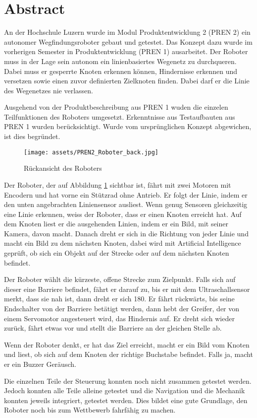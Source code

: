 \section*{Abstract}


An der Hochschule Luzern wurde im Modul Produktentwicklung 2 (PREN 2) ein autonomer Wegfindungsroboter gebaut und getestet. Das Konzept dazu wurde im vorherigen Semester in Produktentwicklung (PREN 1) ausarbeitet. Der Roboter muss in der Lage sein autonom ein linienbasiertes Wegenetz zu durchqueren. Dabei muss er gesperrte Knoten erkennen können, Hindernisse erkennen und versetzen sowie einen zuvor definierten Zielknoten finden. Dabei darf er die Linie des Wegenetzes nie verlassen.


Ausgehend von der Produktbeschreibung aus PREN 1 wuden die einzelen Teilfunktionen des Roboters umgesetzt. Erkenntnisse aus Testaufbauten aus PREN 1 wurden berücksichtigt. Wurde vom ursprünglichen Konzept abgewichen, ist dies begründet. 

\begin{figure}[H]
    \centering
    \texttt{[image: assets/PREN2\_Roboter\_back.jpg]}
    \caption{Rückansicht des Roboters}
    \label{fig:roboter_back}
\end{figure}


Der Roboter, der auf Abbildung \ref{fig:roboter_back} sichtbar ist, fährt mit zwei Motoren mit Encodern und hat vorne ein Stützrad ohne Antrieb. Er folgt der Linie, indem er den unten angebrachten Liniensensor ausliest. Wenn genug Sensoren gleichzeitig eine Linie erkennen, weiss der Roboter, dass er einen Knoten erreicht hat. Auf dem Knoten liest er die ausgehenden Linien, indem er ein Bild, mit seiner Kamera, davon macht. Danach dreht er sich in die Richtung von jeder Linie und macht ein Bild zu dem nächsten Knoten, dabei wird mit Artificial Intelligence geprüft, ob sich ein Objekt auf der Strecke oder auf dem nächsten Knoten befindet.

Der Roboter wählt die kürzeste, offene Strecke zum Zielpunkt. Falls sich auf dieser eine Barriere befindet, fährt er darauf zu, bis er mit dem Ultraschallsensor merkt, dass sie nah ist, dann dreht er sich 180\textdegree. Er fährt rückwärts, bis seine Endschalter von der Barriere betätigt werden, dann hebt der Greifer, der von einem Servomotor angesteuert wird, das Hindernis auf. Er dreht sich wieder zurück, fährt etwas vor und stellt die Barriere an der gleichen Stelle ab.

Wenn der Roboter denkt, er hat das Ziel erreicht, macht er ein Bild vom Knoten und liest, ob sich auf dem Knoten der richtige Buchstabe befindet. Falls ja, macht er ein Buzzer Geräusch.


Die einzelnen Teile der Steuerung konnten noch nicht zusammen getestet werden. Jedoch konnten alle Teile alleine getestet und die Navigation und die Mechanik konnten jeweils integriert, getestet werden. Dies bildet eine gute Grundlage, den Roboter noch bis zum Wettbewerb fahrfähig zu machen.
